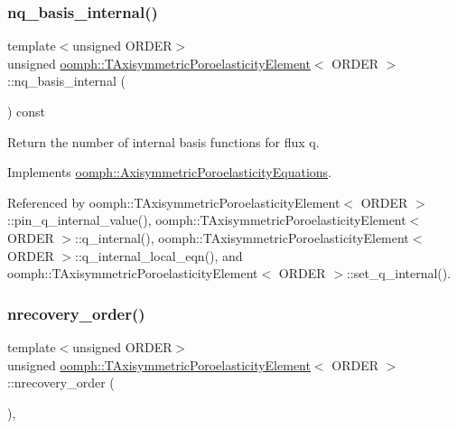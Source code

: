 \subsubsection{\texorpdfstring{nq\+\_\+basis\+\_\+internal()}{nq\_basis\_internal()}\hspace{0.1cm}{\footnotesize\ttfamily [3/3]}}
{\footnotesize\ttfamily template$<$unsigned O\+R\+D\+ER$>$ \\
unsigned \hyperlink{classoomph_1_1TAxisymmetricPoroelasticityElement}{oomph\+::\+T\+Axisymmetric\+Poroelasticity\+Element}$<$ O\+R\+D\+ER $>$\+::nq\+\_\+basis\+\_\+internal (\begin{DoxyParamCaption}{ }\end{DoxyParamCaption}) const\hspace{0.3cm}{\ttfamily [virtual]}}



Return the number of internal basis functions for flux q. 



Implements \hyperlink{classoomph_1_1AxisymmetricPoroelasticityEquations_afa7d0f89a144f2031959d750f7b3ebc1}{oomph\+::\+Axisymmetric\+Poroelasticity\+Equations}.



Referenced by oomph\+::\+T\+Axisymmetric\+Poroelasticity\+Element$<$ O\+R\+D\+E\+R $>$\+::pin\+\_\+q\+\_\+internal\+\_\+value(), oomph\+::\+T\+Axisymmetric\+Poroelasticity\+Element$<$ O\+R\+D\+E\+R $>$\+::q\+\_\+internal(), oomph\+::\+T\+Axisymmetric\+Poroelasticity\+Element$<$ O\+R\+D\+E\+R $>$\+::q\+\_\+internal\+\_\+local\+\_\+eqn(), and oomph\+::\+T\+Axisymmetric\+Poroelasticity\+Element$<$ O\+R\+D\+E\+R $>$\+::set\+\_\+q\+\_\+internal().

\mbox{\label{classoomph_1_1TAxisymmetricPoroelasticityElement_afc5e75420d95d3a70cb5f43aa32f9430}} 
\subsubsection{\texorpdfstring{nrecovery\+\_\+order()}{nrecovery\_order()}}
{\footnotesize\ttfamily template$<$unsigned O\+R\+D\+ER$>$ \\
unsigned \hyperlink{classoomph_1_1TAxisymmetricPoroelasticityElement}{oomph\+::\+T\+Axisymmetric\+Poroelasticity\+Element}$<$ O\+R\+D\+ER $>$\+::nrecovery\+\_\+order (\begin{DoxyParamCaption}{ }\end{DoxyParamCaption})\hspace{0.3cm}{\ttfamily [inline]}, {\ttfamily [virtual]}}



